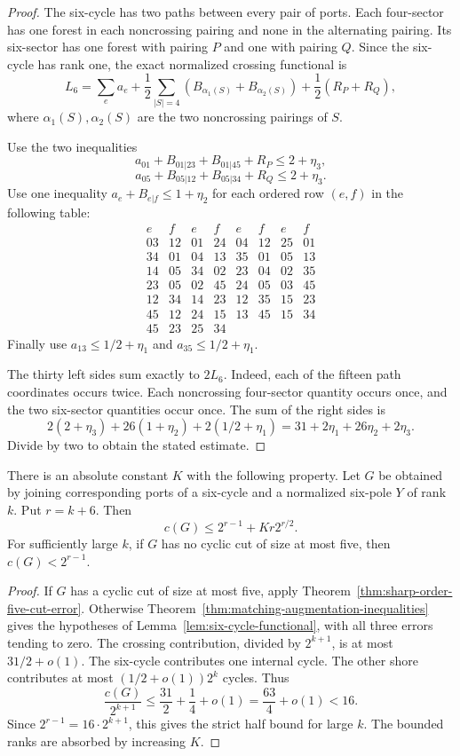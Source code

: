 \begin{proof}
The six-cycle has two paths between every pair of ports.
Each four-sector has one forest in each noncrossing pairing and none in the alternating pairing.
Its six-sector has one forest with pairing $P$ and one with pairing $Q$.
Since the six-cycle has rank one, the exact normalized crossing functional is
\[
 L_6=\sum_ea_e+\frac12\sum_{|S|=4}
       \left(B_{\alpha_1(S)}+B_{\alpha_2(S)}\right)
       +\frac12(R_P+R_Q),
\]
where $\alpha_1(S),\alpha_2(S)$ are the two noncrossing pairings of $S$.

Use the two inequalities
\[
 a_{01}+B_{01|23}+B_{01|45}+R_P\le2+\eta_3,
\]
\[
 a_{05}+B_{05|12}+B_{05|34}+R_Q\le2+\eta_3.
\]
Use one inequality $a_e+B_{e|f}\le1+\eta_2$ for each ordered row $(e,f)$ in the following table:
\[
\begin{array}{cc|cc|cc|cc}
e&f&e&f&e&f&e&f\\\hline
03&12&01&24&04&12&25&01\\
34&01&04&13&35&01&05&13\\
14&05&34&02&23&04&02&35\\
23&05&02&45&24&05&03&45\\
12&34&14&23&12&35&15&23\\
45&12&24&15&13&45&15&34\\
45&23&25&34&&&&
\end{array}
\]
Finally use $a_{13}\le1/2+\eta_1$ and $a_{35}\le1/2+\eta_1$.

The thirty left sides sum exactly to $2L_6$.
Indeed, each of the fifteen path coordinates occurs twice.
Each noncrossing four-sector quantity occurs once, and the two six-sector quantities occur once.
The sum of the right sides is
\[
 2(2+\eta_3)+26(1+\eta_2)+2(1/2+\eta_1)
 =31+2\eta_1+26\eta_2+2\eta_3.
\]
Divide by two to obtain the stated estimate.
\end{proof}

\begin{theorem}
\label{thm:six-cycle-shore-error}
There is an absolute constant $K$ with the following property.
Let $G$ be obtained by joining corresponding ports of a six-cycle and a normalized six-pole $Y$ of rank $k$.
Put $r=k+6$.
Then
\[
 c(G)\le2^{r-1}+Kr2^{r/2}.
\]
For sufficiently large $k$, if $G$ has no cyclic cut of size at most five, then $c(G)<2^{r-1}$.
\end{theorem}

\begin{proof}
If $G$ has a cyclic cut of size at most five, apply Theorem~\ref{thm:sharp-order-five-cut-error}.
Otherwise Theorem~\ref{thm:matching-augmentation-inequalities} gives the hypotheses of Lemma~\ref{lem:six-cycle-functional}, with all three errors tending to zero.
The crossing contribution, divided by $2^{k+1}$, is at most $31/2+o(1)$.
The six-cycle contributes one internal cycle.
The other shore contributes at most $(1/2+o(1))2^k$ cycles.
Thus
\[
 \frac{c(G)}{2^{k+1}}
 \le\frac{31}{2}+\frac14+o(1)
 =\frac{63}{4}+o(1)<16.
\]
Since $2^{r-1}=16\cdot2^{k+1}$, this gives the strict half bound for large $k$.
The bounded ranks are absorbed by increasing $K$.
\end{proof}

